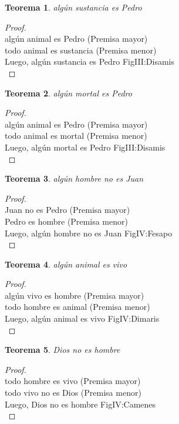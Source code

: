 ﻿\documentclass[12pt]{book}
\newtheorem{theorem}{Teorema}[chapter]
\newtheorem{proof}{Demostración}
\begin{document}
\begin{theorem}
algún sustancia es Pedro
\label{th: 71}
\end{theorem}\begin{proof}\\algún animal es Pedro	 (Premisa mayor) \\todo animal es sustancia	 (Premisa menor) \\Luego, algún sustancia es Pedro	FigIII:Disamis \\ \end{proof}
\begin{theorem}
algún mortal es Pedro
\label{th: 72}
\end{theorem}\begin{proof}\\algún animal es Pedro	 (Premisa mayor) \\todo animal es mortal	 (Premisa menor) \\Luego, algún mortal es Pedro	FigIII:Disamis \\ \end{proof}
\begin{theorem}
algún hombre no es Juan
\label{th: 73}
\end{theorem}\begin{proof}\\Juan no es Pedro	 (Premisa mayor) \\Pedro es hombre	 (Premisa menor) \\Luego, algún hombre no es Juan	FigIV:Fesapo \\ \end{proof}
\begin{theorem}
algún animal es vivo
\label{th: 74}
\end{theorem}\begin{proof}\\algún vivo es hombre	 (Premisa mayor) \\todo hombre es animal	 (Premisa menor) \\Luego, algún animal es vivo	FigIV:Dimaris \\ \end{proof}
\begin{theorem}
Dios no es hombre
\label{th: 75}
\end{theorem}\begin{proof}\\todo hombre es vivo	 (Premisa mayor) \\todo vivo no es Dios	 (Premisa menor) \\Luego, Dios no es hombre	FigIV:Camenes \\ \end{proof}
\end{document}
